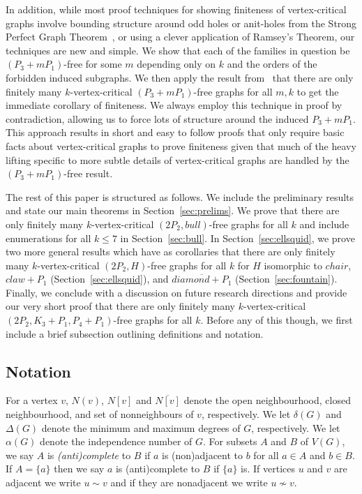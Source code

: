 \documentclass[11pt]{article}
\theoremstyle{definition}
\newcommand{\noneighbs}{\overline{N[v]}}
\begin{document}
In addition, while most proof techniques for showing finiteness of vertex-critical graphs involve bounding structure around odd holes or anit-holes from the Strong Perfect Graph Theorem~\cite{Chudnovsky2006}, or using a clever application of Ramsey's Theorem, our techniques are new and simple. We show that each of the families in question be $(P_3+m P_1)$-free for some $m$ depending only on $k$ and the orders of the forbidden induced subgraphs.  We then apply the result from~\cite{AbuadasCameronHoangSawada2022} that there are only finitely many $k$-vertex-critical $(P_3+m P_1)$-free graphs for all $m,k$ to get the immediate corollary of finiteness. We always employ this technique in proof by contradiction, allowing us to force lots of structure around the induced $P_3+mP_1$. This approach results in short and easy to follow proofs that only require basic facts about vertex-critical graphs to prove finiteness given that much of the heavy lifting specific to more subtle details of vertex-critical graphs are handled by the $(P_3+m P_1)$-free result.

The rest of this paper is structured as follows. We include the preliminary results and state our main theorems in Section~\ref{sec:prelims}. We prove that there are only finitely many $k$-vertex-critical $(2P_2,bull)$-free graphs for all $k$ and include enumerations for all $k\le 7$ in Section~\ref{sec:bull}. In Section~\ref{sec:ellsquid}, we prove two more general results which have as corollaries that there are only finitely many $k$-vertex-critical $(2P_2,H)$-free graphs for all $k$ for $H$ isomorphic to $chair$, $claw+P_1$ (Section~\ref{sec:ellsquid}), and $\overline{diamond+P_1}$ (Section~\ref{sec:fountain}). Finally, we conclude with a discussion on future research directions and provide our very short proof that there are only finitely many $k$-vertex-critical $(2P_2,K_3+P_1,P_4+P_1)$-free graphs for all $k$. Before any of this though, we first include a brief subsection outlining definitions and notation.


\subsection{Notation}

For a vertex $v$, $N(v)$, $N[v]$ and $\noneighbs$ denote the open neighbourhood, closed neighbourhood, and set of nonneighbours of $v$, respectively. We let $\delta(G)$ and $\Delta(G)$ denote the minimum and maximum degrees of $G$, respectively. We let $\alpha(G)$ denote the independence number of $G$. For subsets $A$ and $B$ of $V(G)$, we say $A$ is \textit{(anti)complete} to $B$ if $a$ is (non)adjacent to $b$ for all $a\in A$ and $b\in B$. If $A=\{a\}$ then we say $a$ is (anti)complete to $B$ if $\{a\}$ is. If vertices $u$ and $v$ are adjacent we write $u\sim v$ and if they are nonadjacent we write $u\nsim v$.
\end{document}
